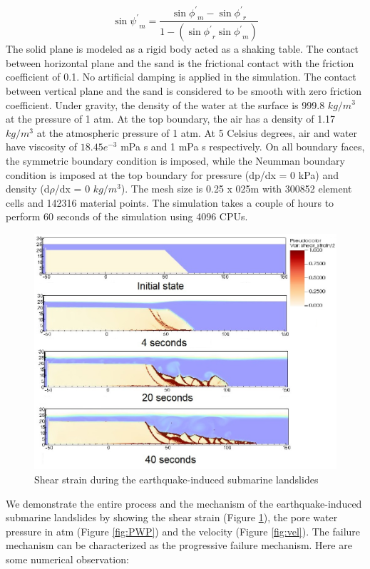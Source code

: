 \documentclass[preprint,12pt]{elsarticle}
\begin{document}
%
%
\begin{equation}
  \sin{\psi^\prime}_m = \frac{\sin{\phi^\prime}_m - \sin{\phi^\prime}_{r}}{1 - (\sin{\phi^\prime}_{r}\sin{\phi^\prime}_m)}
\end {equation}
%
%
The solid plane is modeled as a rigid body acted as a shaking table. The contact between horizontal plane and the sand is the frictional contact with the friction coefficient of 0.1. No artificial damping is applied in the simulation. The contact between vertical plane and the sand is considered to be smooth with zero friction coefficient. Under gravity, the density of the water at the surface is 999.8 $kg/m^3$ at the pressure of 1 atm. At the top boundary, the air has a density of 1.17 $kg/m^3$ at the atmospheric pressure of 1 atm. At 5 Celsius degrees, air and water have viscosity of $18.45e^{-3}$  mPa s and 1  mPa s respectively. On all boundary faces, the symmetric boundary condition is imposed, while the Neumman boundary condition is imposed at the top boundary for pressure (dp/dx = 0 kPa) and density (d$\rho$/dx = 0 $kg/m^3$). The mesh size is 0.25 x 025m with 300852 element cells and 142316 material points. The simulation takes a couple of hours to perform 60 seconds of the simulation using 4096 CPUs. \\
%
\begin{figure}[H]
\center
\includegraphics[scale=0.5]{landslide_gamma.jpeg}
\caption{Shear strain during the earthquake-induced submarine landslides}
\label{fig:gamma}
\end {figure}
%
%
We demonstrate the entire process and the mechanism of the earthquake-induced submarine landslides by showing the shear strain (Figure \ref{fig:gamma}), the pore water pressure in atm (Figure \ref{fig:PWP}) and the velocity (Figure \ref{fig:vel}). The failure mechanism can be characterized as the progressive failure mechanism. Here are some numerical observation:\\
\end{document}

